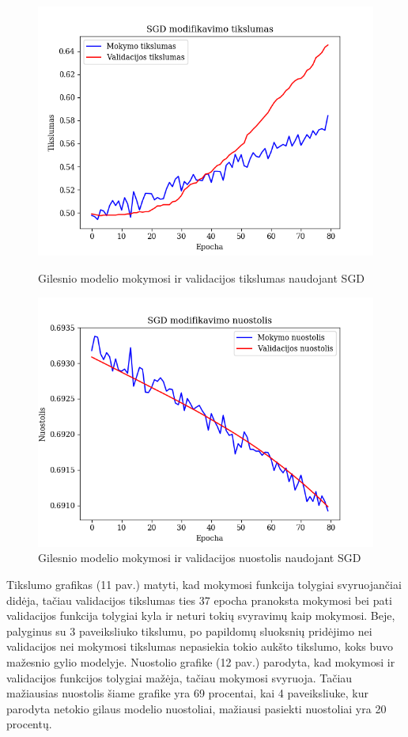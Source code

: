 \documentclass{VUMIFPSkursinis}
\begin{document}
\begin{figure}[!htbp]
  \centering
  \begin{minipage}[b]{0.49\textwidth}
    \includegraphics[width=\textwidth]{img/AL/SGD_acc.png}
    \caption{Gilesnio modelio mokymosi ir validacijos tikslumas naudojant SGD}
  \end{minipage}
  \begin{minipage}[b]{0.49\textwidth}
    \includegraphics[width=\textwidth]{img/AL/SGD_loss.png}
    \caption{Gilesnio modelio mokymosi ir validacijos nuostolis naudojant SGD}
  \end{minipage}
\end{figure}

Tikslumo grafikas (11 pav.) matyti, kad mokymosi funkcija tolygiai svyruojančiai didėja, tačiau validacijos tikslumas ties 37 epocha pranoksta mokymosi bei pati validacijos funkcija tolygiai kyla ir neturi 
tokių svyravimų kaip mokymosi. Beje, palyginus su 3 paveiksliuko tikslumu, po papildomų sluoksnių pridėjimo nei validacijos nei mokymosi tikslumas nepasiekia tokio aukšto tikslumo, koks buvo mažesnio gylio modelyje.
Nuostolio grafike (12 pav.) parodyta, kad mokymosi ir validacijos funkcijos tolygiai mažėja, tačiau mokymosi svyruoja. Tačiau mažiausias nuostolis šiame grafike yra 69 procentai, kai 4 paveiksliuke, kur parodyta 
netokio gilaus modelio nuostoliai, mažiausi pasiekti nuostoliai yra 20 procentų.
\end{document}
